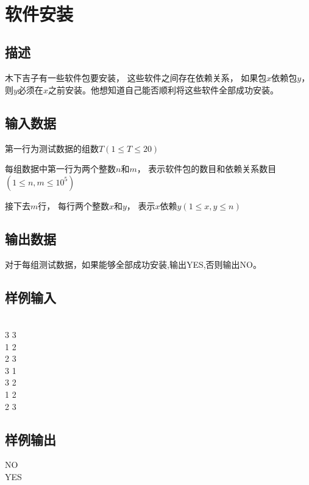\documentclass[UTF8]{ctexrep}
\begin{document}
\tt
{}
\fi


\section{软件安装}
\subsection*{描述}
木下吉子有一些软件包要安装， 这些软件之间存在依赖关系， 如果包$x$依赖包$y$， 则$y$必须在$x$之前安装。他想知道自己能否顺利将这些软件全部成功安装。

\subsection*{输入数据}
第一行为测试数据的组数$T(1\leqslant T\leqslant 20)$

每组数据中第一行为两个整数$n$和$m$， 表示软件包的数目和依赖关系数目$(1\leqslant n, m\leqslant 10^5)$

接下去$m$行， 每行两个整数$x$和$y$， 表示$x$依赖$y(1\leqslant x, y\leqslant n)$

\subsection*{输出数据}
对于每组测试数据，如果能够全部成功安装,输出YES,否则输出NO。

\subsection*{样例输入}
\\
3 3\\
1 2\\
2 3\\
3 1\\
3 2\\
1 2\\
2 3

\subsection*{样例输出}
\noindent NO\\
YES


\ifx\allfiles\undefined
\end{document}
